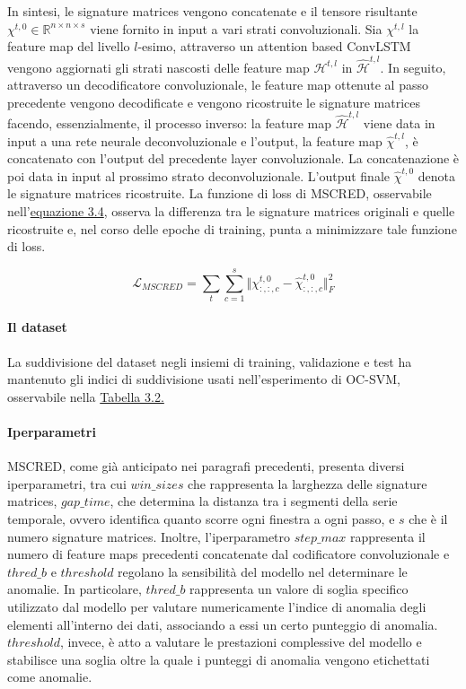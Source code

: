     In sintesi, le signature matrices vengono concatenate e il tensore risultante $\chi^{t,0} \in \mathbb{R}^{n \times n \times s}$ 
    viene fornito in input a vari strati convoluzionali. Sia $\chi^{t,l}$ la feature map del livello $l$-esimo, attraverso un 
    attention based ConvLSTM\cite{convlstm} vengono aggiornati gli strati nascosti delle feature map $\mathcal{H}^{t,l}$ in $\hat{\mathcal{H}}^{t,l}$. 
    In seguito, attraverso un decodificatore convoluzionale, le feature map ottenute al passo precedente vengono decodificate e
    vengono ricostruite le signature matrices facendo, essenzialmente, il processo inverso: la feature map $\hat{\mathcal{H}}^{t,l}$ 
    viene data in input a una rete neurale deconvoluzionale e l'output, la feature map $\hat{\chi}^{t,l}$, è concatenato 
    con l'output del precedente layer convoluzionale. La concatenazione è poi data in input al prossimo strato deconvoluzionale. 
    L'output finale $\hat{\chi}^{t,0}$ denota le signature matrices ricostruite. La funzione di loss di MSCRED, osservabile
    nell'\hyperref[eq:mscred-loss]{equazione 3.4}, osserva la differenza tra le signature matrices originali e quelle ricostruite e, 
    nel corso delle epoche di training, punta a minimizzare tale funzione di loss.       

    \begin{equation}\label{eq:mscred-loss}
        \mathcal{L}_{MSCRED} = \sum_t \sum_{c=1}^s \Vert \chi^{t,0}_{:,:,c} - \hat{\chi}^{t,0}_{:,:,c} \Vert^2_F
    \end{equation}



    \paragraph{Il dataset} La suddivisione del dataset negli insiemi di training, validazione e test ha mantenuto 
    gli indici di suddivisione usati nell'esperimento di OC-SVM, osservabile nella 
    \hyperref[tab:dataset-ocsvm]{Tabella 3.2.}

    \paragraph{Iperparametri} MSCRED, come già anticipato nei paragrafi precedenti, presenta diversi iperparametri, tra cui 
    $win\_sizes$ che rappresenta la larghezza delle signature matrices, $gap\_time$, che determina la distanza tra i segmenti 
    della serie temporale, ovvero identifica quanto scorre ogni finestra a ogni passo, e $s$ che è il numero signature matrices. 
    Inoltre, l'iperparametro $step\_max$ rappresenta il numero di feature maps precedenti 
    concatenate dal codificatore convoluzionale e $thred\_b$ e $threshold$ regolano la sensibilità del modello 
    nel determinare le anomalie. In particolare, $thred\_b$ rappresenta un valore di soglia specifico utilizzato 
    dal modello per valutare numericamente l'indice di anomalia degli elementi all'interno dei dati, associando a essi
    un certo punteggio di anomalia. $threshold$, invece, è atto a valutare le prestazioni complessive 
    del modello e stabilisce una soglia oltre la quale i punteggi di anomalia vengono etichettati come anomalie.

